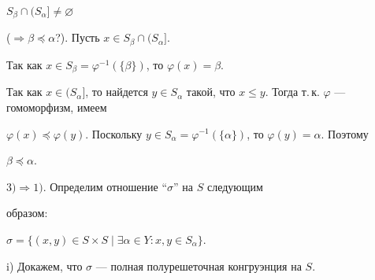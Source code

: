 \begin{itemize}
$S_\beta\cap(S_\alpha]\ne\varnothing$ 


($\Rightarrow\beta\preceq\alpha$?). Пусть $x\in S_\beta\cap(S_\alpha]$. 


Так как $x\in S_\beta=\varphi^{-1}(\{\beta\})$, то $\varphi(x)=\beta$. 


Так как $x\in(S_\alpha]$, то найдется $y\in S_\alpha$ такой, что $x\le 


y$. Тогда т.\,к. $\varphi$ --- гомоморфизм, имеем 


$\varphi(x)\preceq\varphi(y)$. Поскольку $y\in 


S_\alpha=\varphi^{-1}(\{\alpha\})$, то $\varphi(y)=\alpha$. Поэтому 


$\beta\preceq\alpha$. 


\end{itemize} 


\medskip 


 


$3)\Rightarrow1)$. Определим отношение ``$\sigma$'' на $S$ следующим 


образом: 


$\sigma=\{(x,y)\in S\times S\mid\exists\alpha\in Y:x,y\in S_\alpha\}$. 


 


i) Докажем, что $\sigma$ --- полная полурешеточная конгруэнция на $S$. 


